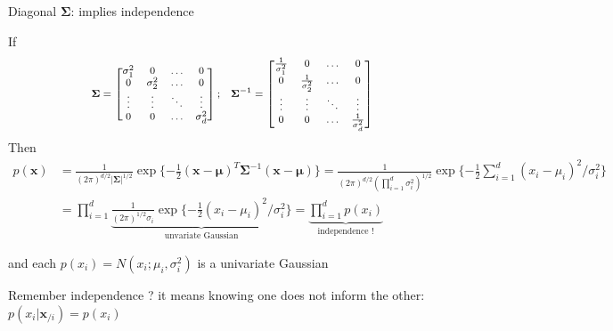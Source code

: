 \documentclass[11pt,ignorenonframetext,aspectratio=169]{beamer}
\newcommand{\vv}[1]{\boldsymbol{#1}}
\begin{document}
\begin{frame}{Diagonal \(\vv{\Sigma}\): implies independence}
\protect\hypertarget{diagonal-vvsigma-implies-independence}{}

If
\[\footnotesize \vv{\Sigma} = \begin{bmatrix}\sigma_1^2 & 0 & \ldots & 0 \\ 0 &\sigma^2_2 & \ldots & 0 \\ \vdots & \vdots & \ddots & \vdots \\ 0 & 0 & \ldots & \sigma^2_d  \end{bmatrix};\;\;\;\vv{\Sigma}^{-1} = \begin{bmatrix}\frac{1}{\sigma_1^2} & 0 & \ldots & 0 \\ 0 &\frac{1}{\sigma^2_2} & \ldots & 0 \\ \vdots & \vdots & \ddots & \vdots \\ 0 & 0 & \ldots & \frac{1}{\sigma^2_d}  \end{bmatrix}\]
Then \footnotesize 
\begin{align*} p(\vv{x}) &=  \frac{1}{(2\pi)^{d/2} |\vv{\Sigma}|^{1/2}} \exp\{-\frac{1}{2}
(\vv{x} -\vv{\mu})^T\vv{\Sigma}^{-1}(\vv{x}-\vv{\mu})\} =\frac{1}{(2\pi)^{d/2} (\prod_{i=1}^d \sigma_i^2)^{1/2}} \exp \{-\frac{1}{2} \sum_{i=1}^d (x_i-\mu_i)^2/\sigma_i^2\} \\
&= \prod_{i=1}^d \underbrace{\frac{1}{(2\pi)^{1/2} \sigma_i} \exp \{-\frac{1}{2} (x_i-\mu_i)^2/\sigma_i^2 \}}_{\text{unvariate Gaussian}} =\underbrace{ \prod_{i=1}^d p(x_i)}_{
\text{independence !}}
\end{align*}

and each \(p(x_i) = N(x_i; \mu_i, \sigma^2_i)\) is a univariate Gaussian

Remember independence ?
\colorbox{red!20}{it means knowing one does not inform the other: $p(x_i|\vv{x}_{/i})=p(x_i)$}

\end{frame}
\end{document}
